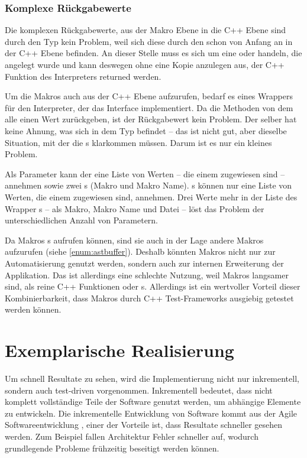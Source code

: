     \subsubsection{Komplexe Rückgabewerte}
    \label{sssec:Komplexe Rückgabewerte}
      Die komplexen Rückgabewerte, aus der Makro Ebene in die C++ Ebene sind durch den  Typ kein Problem, weil sich diese durch den  schon von Anfang an in der C++ Ebene befinden. An dieser Stelle muss es sich um eine  oder  handeln, die angelegt wurde und kann deswegen ohne eine Kopie anzulegen aus, der C++ Funktion des Interpreters returned werden.

      Um die Makros auch aus der C++ Ebene aufzurufen, bedarf es eines Wrappers für den Interpreter, der das  Interface implementiert. Da die  Methoden von dem  alle einen  Wert zurückgeben, ist der Rückgabewert kein Problem. Der  selber hat keine Ahnung, was sich in dem  Typ befindet -- das ist nicht gut, aber dieselbe Situation, mit der die s klarkommen müssen. Darum ist es nur ein kleines Problem.

      Als Parameter kann der  eine Liste von  Werten -- die einem  zugewiesen sind -- annehmen sowie zwei s (Makro und Makro Name). s können nur eine Liste von  Werten, die einem  zugewiesen sind, annehmen. Drei  Werte mehr in der Liste des Wrapper s -- als Makro, Makro Name und Datei -- löst das Problem der unterschiedlichen Anzahl von Parametern.

      Da Makros s aufrufen können, sind sie auch in der Lage andere Makros aufzurufen (siehe \ref{enum:astbuffer}). Deshalb könnten Makros nicht nur zur Automatisierung genutzt werden, sondern auch zur internen Erweiterung der Applikation. Das ist allerdings eine schlechte Nutzung, weil Makros langsamer sind, als reine C++ Funktionen oder s. Allerdings ist ein wertvoller Vorteil dieser Kombinierbarkeit, dass Makros durch C++ Test-Frameworks ausgiebig getestet werden können.

\section{Exemplarische Realisierung}
\label{sec:Exemplarische Realisierung}
  Um schnell Resultate zu sehen, wird die Implementierung nicht nur inkrementell, sondern auch test-driven \autocite{beck2003test} vorgenommen. Inkrementell bedeutet, dass nicht komplett vollständige Teile der Software genutzt werden, um abhängige Elemente zu entwickeln. Die inkrementelle Entwicklung von Software kommt aus der Agile Softwareentwicklung \autocite{cohen2003agile}, einer der Vorteile ist, dass Resultate schneller gesehen werden. Zum Beispiel fallen Architektur Fehler schneller auf, wodurch grundlegende Probleme frühzeitig beseitigt werden können.

